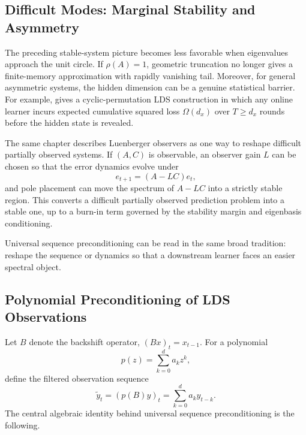 \documentclass[11pt]{article}
\theoremstyle{plain}
\theoremstyle{definition}
\theoremstyle{remark}
\begin{document}
\subsection{Difficult Modes: Marginal Stability and Asymmetry}
\label{sec:difficult-modes}

The preceding stable-system picture becomes less favorable when eigenvalues approach the unit circle. If $\rho(A)=1$, geometric truncation no longer gives a finite-memory approximation with rapidly vanishing tail. Moreover, for general asymmetric systems, the hidden dimension can be a genuine statistical barrier. For example, \citet[Thm.~12.1]{hazan2025onlinecontrol} gives a cyclic-permutation LDS construction in which any online learner incurs expected cumulative squared loss $\Omega(d_x)$ over $T\ge d_x$ rounds before the hidden state is revealed.

The same chapter describes Luenberger observers as one way to reshape difficult partially observed systems. If $(A,C)$ is observable, an observer gain $L$ can be chosen so that the error dynamics evolve under
\[
    e_{t+1} = (A-LC)e_t,
\]
and pole placement can move the spectrum of $A-LC$ into a strictly stable region. This converts a difficult partially observed prediction problem into a stable one, up to a burn-in term governed by the stability margin and eigenbasis conditioning.

Universal sequence preconditioning can be read in the same broad tradition: reshape the sequence or dynamics so that a downstream learner faces an easier spectral object.

\subsection{Polynomial Preconditioning of LDS Observations}
\label{sec:polynomial-preconditioning-prelim}

Let $B$ denote the backshift operator, $(Bx)_t=x_{t-1}$. For a polynomial
\[
    p(z)=\sum_{k=0}^{d}a_k z^k,
\]
define the filtered observation sequence
\begin{equation}
    \tilde y_t=(p(B)y)_t=\sum_{k=0}^{d} a_k y_{t-k}.
    \label{eq:poly-filter-output}
\end{equation}
The central algebraic identity behind universal sequence preconditioning is the following.
\end{document}
